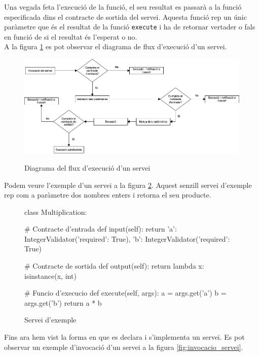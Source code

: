 	Una vegada feta l'execució de la funció, el seu resultat es passarà a la funció especificada dins el contracte de sortida del servei. Aquesta funció rep un únic paràmetre que és el resultat de la funció \texttt{execute} i ha de retornar vertader o fals en funció de si el resultat és l'esperat o no.\\
	
	A la figura \ref{fig:fluxe} es pot observar el diagrama de flux d'execució d'un servei. 
	
	\begin{figure}[h!]
		\includegraphics[scale=0.35]{img/flux.png}
		\label{fig:fluxe}
		\caption{Diagrama del flux d'execució d'un servei}
	\end{figure}
	
	Podem veure l'exemple d'un servei a la figura \ref{fig:ex_servei}. Aquest senzill servei d'exemple rep com a paràmetre dos nombres enters i retorna el seu producte. 
	
	\begin{figure}[h!]
		\begin{python}
class Multiplication:
	
	# Contracte d'entrada
	def input(self):
		return {
			'a': IntegerValidator({'required': True}),
			'b': IntegerValidator({'required': True})
		}
	
	# Contracte de sortida
	def output(self):
		return lambda x: isinstance(x, int)
		
	# Funcio d'execucio
	def execute(self, args):
		a = args.get('a')
		b = args.get('b')
		return a * b
		\end{python}
		\caption{Servei d'exemple}
		\label{fig:ex_servei}
	\end{figure}
	
	Fins ara hem vist la forma en que es declara i s'implementa un servei. Es pot observar un exemple d'invocació d'un servei a la figura \ref{fig:invocacio_servei}. \\
	
